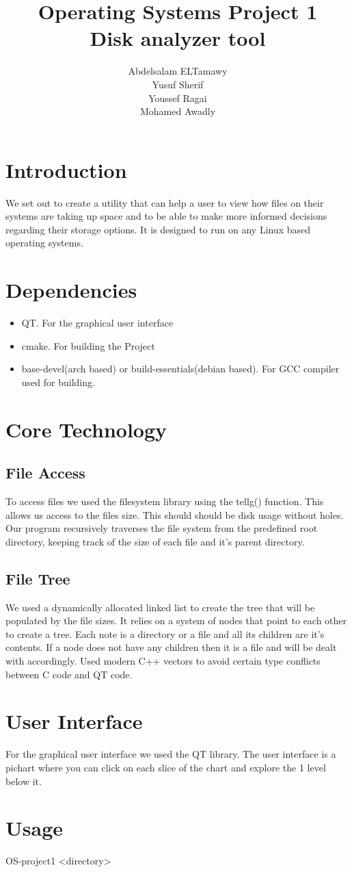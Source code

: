 \documentclass[]{article}
\author{Abdelsalam ELTamawy\\Yusuf Sherif\\Youssef Ragai\\Mohamed Awadly}
\title{Operating Systems Project 1\\Disk analyzer tool}
\begin{document}
    \begin{titlepage}

        \maketitle
    \end{titlepage}

    \section{Introduction}
    We set out to create a utility that can help a user to view how files on their systems are taking up space and to be able to make more informed decisions regarding their storage options.
    It is designed to run on any Linux based operating systems.

    \section{Dependencies}
    \begin{itemize}
        \item QT. For the graphical user interface
        \item cmake. For building the Project
        \item base-devel(arch based) or build-essentials(debian based). For GCC compiler used for building.
    \end{itemize}

    \section{Core Technology}
    \subsection{File Access}
    To access files we used the filesystem library using the tellg() function.
    This allows us access to the files size. This should should be disk usage without holes. Our program recursively traverses the file system from the predefined root directory, keeping track of the size of each file and it's parent directory.

    \subsection{File Tree}
    We used a dynamically allocated linked list to create the tree that will be populated by the file sizes. It relies on a system of nodes that point to each other to create a tree. Each note is a directory or a file and all its children are it's contents.
    If a node does not have any children then it is a file and will be dealt with accordingly. Used modern C++ vectors to avoid certain type conflicts between C code and QT code.

    \section{User Interface}
	For the graphical user interface we used the QT library. The user interface is a pichart where you can click on each slice of the chart and explore the 1 level below it.
	
	\section{Usage}
	OS-project1 <directory>
\end{document}
